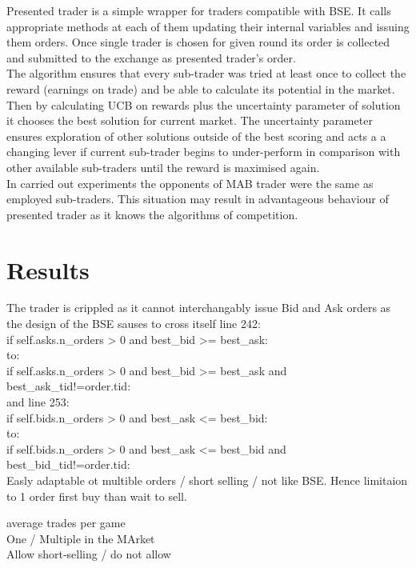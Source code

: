 \documentclass{llncs}
\begin{document}
Presented trader is a simple wrapper for traders compatible with BSE. It calls appropriate methods at each of them updating their internal variables and issuing them orders. Once single trader is chosen for given round its order is collected and submitted to the exchange as presented trader's order.\\
The algorithm ensures that every sub-trader was tried at least once to collect the reward (earnings on trade) and be able to calculate its potential in the market. Then by calculating UCB on rewards plus the uncertainty parameter of solution it chooses the best solution for current market. The uncertainty parameter ensures exploration of other solutions outside of the best scoring and acts a a changing lever if current sub-trader begins to under-perform in comparison with other available sub-traders until the reward is maximised again.\\

In carried out experiments the opponents of MAB trader were the same as employed sub-traders. This situation may result in advantageous behaviour of presented trader as it knows the algorithms of competition.

\section{Results}
The trader is crippled as it cannot interchangably issue Bid and Ask orders as the design of the BSE sauses to cross itself
line 242:\\
if self.asks.n_orders > 0 and best_bid >= best_ask:\\
to:\\
if self.asks.n_orders > 0 and best_bid >= best_ask and best_ask_tid!=order.tid:\\

and line 253:\\
if self.bids.n_orders > 0 and best_ask <= best_bid:\\
to:\\
if self.bids.n_orders > 0 and best_ask <= best_bid and best_bid_tid!=order.tid:\\

Easly adaptable ot multible orders / short selling / not like BSE. Hence limitaion to 1 order first buy than wait to sell.


average trades per game\\
One / Multiple in the MArket\\
Allow short-selling / do not allow\\
\end{document}

